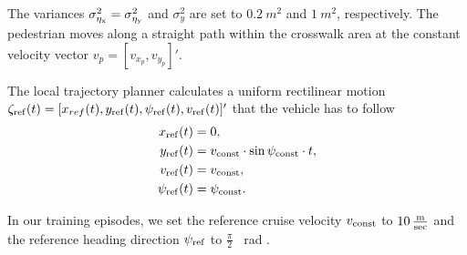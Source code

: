The variances $\sigma_{\rm \eta_x}^2 = \sigma_{\rm \eta_y}^2$ and $\sigma_{y}^2$ are set to $\SI{0.2}{m^2}$ and $\SI{1}{m^2}$, respectively. The pedestrian moves along a straight path within the crosswalk area at the constant velocity vector $v_p=[v_{x_p}, v_{y_p}]'$.








\label{sub_sec:3-c}
The local trajectory planner calculates a uniform rectilinear motion  $\zeta_{\rm ref}(t)=[x_{ref}(t) ,y_{\rm ref}(t),\psi_{\rm ref}(t),v_{\rm ref}(t)]' $ that the vehicle has to follow
\begin{equation}
\centering
\begin{aligned}
	x_{\rm ref}(t)&=0, \\ 
	y_{\rm ref}(t) &=  v_{\rm const} \cdot \sin{\psi_{\rm const}} \cdot t, \\
	v_{\rm ref}(t) &= v_{\rm const}, \\
	\psi_{\rm ref}(t) &= \psi_{\rm const}.
\end{aligned}
\end{equation}



In our training episodes, we set the reference cruise velocity $v_{\rm const}$ to $\SI{10}{\frac{\metre}{\sec}}$ and the reference heading direction $\psi_{\rm ref}$ to $\frac{\pi}{2}$ \SI{}{\radian} . 



